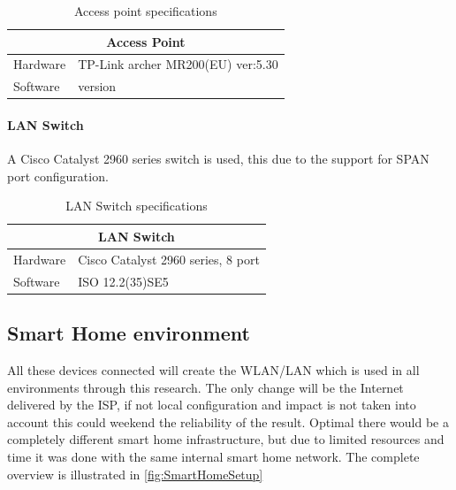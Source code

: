 \begin{table}[H]
\centering
\caption{Access point specifications}
\label{tab:AccessPointSpec}
\begin{tabular}{|ll|}
\hline
\multicolumn{2}{|c|}{\textbf{Access Point}}                        \\ \hline
\multicolumn{1}{|l|}{Hardware} & TP-Link archer MR200(EU) ver:5.30 \\ \hline
\multicolumn{1}{|l|}{Software} & version                           \\ \hline
\end{tabular}
\end{table}

\paragraph{LAN Switch}
A Cisco Catalyst 2960 series switch is used, this due to the support for SPAN port configuration. 

\begin{table}[H]
\centering
\caption{LAN Switch specifications}
\label{tab:LanSwitchSpec}
\begin{tabular}{|ll|}
\hline
\multicolumn{2}{|c|}{\textbf{LAN Switch}}                           \\ \hline
\multicolumn{1}{|l|}{Hardware} & Cisco Catalyst 2960 series, 8 port \\ \hline
\multicolumn{1}{|l|}{Software} & ISO 12.2(35)SE5                    \\ \hline
\end{tabular}
\end{table}


\subsection{Smart Home environment}
All these devices connected will create the WLAN/LAN which is used in all environments through this research. The only change will be the Internet delivered by the ISP, if not local configuration and impact is not taken into account this could weekend the reliability of the result. Optimal there would be a completely different smart home infrastructure, but due to limited resources and time it was done with the same internal smart home network. The complete overview is illustrated in \ref{fig:SmartHomeSetup} 

